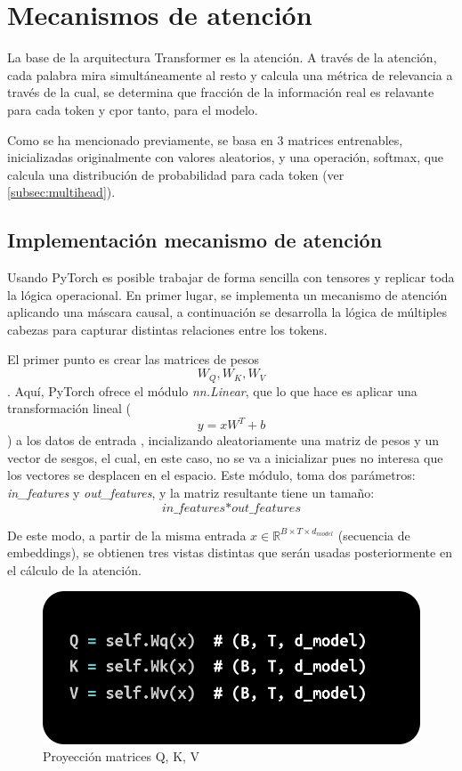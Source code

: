 \documentclass[11pt]{book}
\theoremstyle{plain}
\theoremstyle{definition}
\begin{document}
\section{Mecanismos de atención}
La base de la arquitectura Transformer es la atención. A través de la atención, cada palabra mira simultáneamente al resto y calcula una métrica de relevancia a través de la cual, se determina que fracción de la información real es relavante para cada token y cpor tanto, para el modelo. 

Como se ha mencionado previamente, se basa en 3 matrices entrenables, inicializadas originalmente con valores aleatorios, y una operación, softmax, que calcula una distribución de probabilidad para cada token (ver \cref{subsec:multihead}).


\subsection{Implementación mecanismo de atención}
Usando PyTorch es posible trabajar de forma sencilla con tensores y replicar toda la lógica operacional. En primer lugar, se implementa un mecanismo de atención aplicando una máscara causal, a continuación se desarrolla la lógica de múltiples cabezas para capturar distintas relaciones entre los tokens.

El primer punto es crear las matrices de pesos \[W_Q, W_K, W_V\]. Aquí, PyTorch ofrece el módulo \textit{nn.Linear}, que lo que hace es aplicar una transformación lineal (\[y = xW^T + b\]) a los datos de entrada \parencite{kanaries_nnlinear}, incializando aleatoriamente una matriz de pesos y un vector de sesgos, el cual, en este caso, no se va a inicializar pues no interesa que los vectores se desplacen en el espacio. Este módulo, toma dos parámetros: \textit{in\_features} y \textit{out\_features}, y la matriz resultante tiene un tamaño: \[\textit{in\_features} * \textit{out\_features}\]


De este modo, a partir de la misma entrada $x \in \mathbb{R}^{B \times T \times d_{model}}$ 
(secuencia de embeddings), se obtienen tres vistas distintas que serán usadas 
posteriormente en el cálculo de la atención.

\begin{figure}[h]
    \centering
    \includegraphics[width=0.5\linewidth]{img/Q_K_V.png}
    \caption{Proyección matrices Q, K, V}
    \label{fig:Proyección8}
\end{figure}
\end{document}
